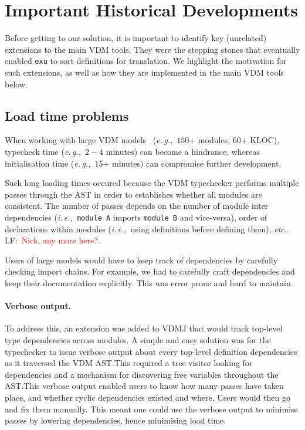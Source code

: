 \documentclass[runningheads,a4paper]{llncs}
\newcommand{\eg}{{\em e.\,g.,\/}}
\newcommand{\ie}{{\em i.\,e.,\/}}
\newcommand{\lfcomment}[1]{LF:~\textcolor{red}{#1}}
\begin{document}

\section{Important Historical Developments}\label{sec:history}

Before getting to our solution, it is important to identify key (unrelated) extensions to the main VDM tools. They were the stepping stones that eventually enabled \texttt{exu} to sort definitions for translation. We highlight the motivation for such extensions, as well as how they are implemented in the main VDM tools below.

\subsection{Load time problems}

When working with large VDM models~\cite{emv2} (\eg~\(150\)+ modules, \(60\)+ KLOC), typecheck time (\eg~\(2-4\) minutes) can become a hindrance, whereas initialisation time (\eg~\(15\)+ minutes) can compromise further development. 

Such long loading times occured because the VDM typechecker performs multiple passes through the AST in order to establishes whether all modules are 
consistent. The number of passes depends on the number of module inter dependencies (\ie~\texttt{module A} imports \texttt{module B} and vice-versa), order of declarations within modules (\ie~using definitions before defining them), \textit{etc.}. \lfcomment{Nick, any more here?}. 

Users of large models would have to keep track of dependencies by carefully checking import chains. For example, we had to carefully craft dependencies and keep their documentation explicitly. This was error prone and hard to maintain. 

\paragraph*{Verbose output.}
%
To address this, an extension was added to VDMJ that would track top-level type dependencies across modules. A simple and easy solution was for the typechecker to issue verbose output about every top-level definition dependencies as it traversed the VDM AST.\@ This required a tree visitor looking for dependencies and a mechanism for discovering free variables throughout the AST.\@ This verbose output enabled users to know how many passes have taken place, and whether cyclic dependencies existed and where. Users would then go and fix them manually. This meant one could use the verbose output to minimise passes by lowering dependencies, hence minimising load time.   
\end{document}
